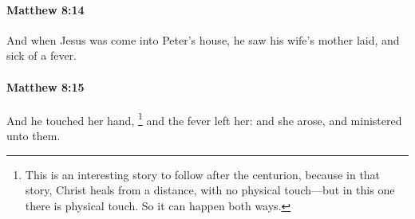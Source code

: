 		\paragraph{Matthew 8:14} %
			\label{MATTHEW-8-14}

			And when Jesus was come into Peter's house, he saw his wife's mother laid, and sick of a fever.

			\begin{framed}
			\scriptsize
				\begin{compactdesc}
					\item[SBLG] 
				\end{compactdesc}
			\end{framed}

		\paragraph{Matthew 8:15} %
			\label{MATTHEW-8-15}

			And he touched her hand,%
				\footnote{%
					This is an interesting story to follow after the centurion, because in that story, Christ heals from a distance, with no physical touch---but in this one there is physical touch. So it can happen both ways.
					}
			and the fever left her: and she arose, and ministered unto them.

